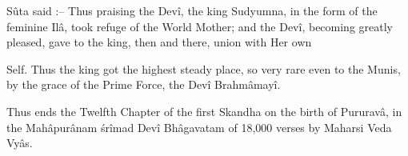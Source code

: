 S\^uta said :-- Thus praising the Dev\^i, the king Sudyumna, in the form of the feminine Il\^a, took refuge of the World Mother; and the Dev\^i, becoming greatly pleased, gave to the king, then and there, union with Her own

Self. Thus the king got the highest steady place, so very rare even to the Munis, by the grace of the Prime Force, the Dev\^i Brahm\^amay\^i.

Thus ends the Twelfth Chapter of the first Skandha on the birth of Pururav\^a, in the Mah\^apur\^anam \'sr\^imad Dev\^i Bh\^agavatam of 18,000 verses by Maharsi Veda Vy\^as.